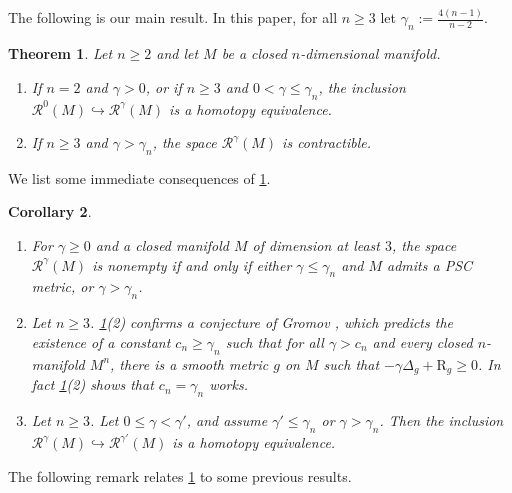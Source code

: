 \documentclass[11pt]{amsart}
\numberwithin{equation}{section}
\newtheorem{bigthm}{Theorem}
\newtheorem{bigcor}[bigthm]{Corollary}
\newcommand{\Riem}{\mathcal{R}}
\newcommand{\scal}{\mathrm{R}}
\newcommand{\embeds}{\hookrightarrow}
\let\ge\geqslant
\let\geq\geqslant
\let\le\leqslant
\let\leq\leqslant
\begin{document}
The following is our main result. In this paper, for all $n\geq 3$ let $\gamma_n:=\frac{4(n-1)}{n-2}$.
\begin{bigthm}\label{main:contractibility}
  Let $n\ge2$ and let $M$ be a closed $n$-dimensional manifold. 
  \begin{enumerate}
    \item[\rm(1)] If $n=2$ and $\gamma> 0$, or if $n\ge3$ and $0 <  \gamma\le\gamma_n$, the inclusion \(\Riem^0(M)\embeds\Riem^\gamma(M)\) is a homotopy equivalence.
    \item[\rm(2)] If $n\ge3$ and $\gamma>\gamma_n$, the space $\Riem^\gamma(M)$ is contractible.
  \end{enumerate}
\end{bigthm}

\noindent We list some immediate consequences of \cref{main:contractibility}.

\begin{bigcor}\leavevmode
  \begin{enumerate}
    \item [a)]
    For $\gamma\ge0$ and a closed manifold $M$ of dimension at least $3$, the space $\Riem^{\gamma}(M)$ is nonempty if and only if either $\gamma\le \gamma_n$ and $M$ admits a PSC metric, or $\gamma>\gamma_n$.
    \item [b)]
    Let $n\geq 3$. \cref{main:contractibility}(2) confirms a conjecture of Gromov \cite[Conjecture 3, Section 6.1.2]{GromovFourLectures}, which predicts the existence of a constant $c_n\ge\gamma_n$ such that for all $\gamma>c_n$ and every closed $n$-manifold $M^n$, there is a smooth metric $g$ on $M$ such that $-\gamma\Delta_g+\scal_g\geq 0$. In fact \cref{main:contractibility}(2) shows that $c_n=\gamma_n$ works.
    \item [c)]
    Let $n\geq 3$. Let $0\leq\gamma <\gamma'$, and assume $\gamma'\leq\gamma_n$ or $\gamma>\gamma_n$. Then the inclusion
$\Riem^\gamma(M)\hookrightarrow\Riem^{\gamma'}(M)$
    is a homotopy equivalence.
  \end{enumerate}
\end{bigcor}

The following remark relates \cref{main:contractibility} to some previous results.
\end{document}
